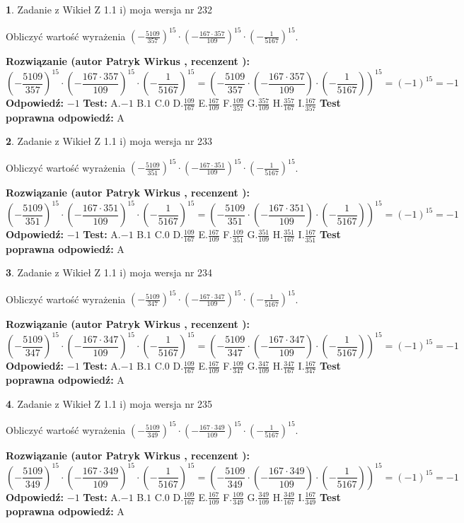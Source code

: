 \documentclass[12pt, a4paper]{article}
\theoremstyle{definition} %
\newtheorem{zad}{}
\newcommand{\zadStart}[1]{\begin{zad}#1\newline}
\newcommand{\zadStop}{\end{zad}}
\newcommand{\rozwStart}[2]{\noindent \textbf{Rozwiązanie (autor #1 , recenzent #2): }\newline}
\newcommand{\rozwStop}{\newline}
\newcommand{\odpStart}{\noindent \textbf{Odpowiedź:}\newline}
\newcommand{\odpStop}{\newline}
\newcommand{\testStart}{\noindent \textbf{Test:}\newline}
\newcommand{\testStop}{\newline}
\newcommand{\kluczStart}{\noindent \textbf{Test poprawna odpowiedź:}\newline}
\newcommand{\kluczStop}{\newline}
\begin{document}
\zadStart{Zadanie z Wikieł Z 1.1 i) moja wersja nr 232}

Obliczyć wartość wyrażenia $(-\frac{5109}{357})^{15} \cdot (-\frac{167 \cdot 357}{109})^{15} \cdot (-\frac{1}{5167})^{15}$.
\zadStop
\rozwStart{Patryk Wirkus}{}
$$(-\frac{5109}{357})^{15} \cdot (-\frac{167 \cdot 357}{109})^{15} \cdot (-\frac{1}{5167})^{15} = (-\frac{5109}{357} \cdot (-\frac{167 \cdot 357}{109}) \cdot (-\frac{1}{5167}))^{15} = (-1)^{15} = -1$$
\rozwStop
\odpStart
$-1$
\odpStop
\testStart
A.$-1$ B.$1$ C.$0$ D.$\frac{109}{167}$ E.$\frac{167}{109}$
F.$\frac{109}{357}$ G.$\frac{357}{109}$
H.$\frac{357}{167}$
I.$\frac{167}{357}$
\testStop
\kluczStart
A
\kluczStop



\zadStart{Zadanie z Wikieł Z 1.1 i) moja wersja nr 233}

Obliczyć wartość wyrażenia $(-\frac{5109}{351})^{15} \cdot (-\frac{167 \cdot 351}{109})^{15} \cdot (-\frac{1}{5167})^{15}$.
\zadStop
\rozwStart{Patryk Wirkus}{}
$$(-\frac{5109}{351})^{15} \cdot (-\frac{167 \cdot 351}{109})^{15} \cdot (-\frac{1}{5167})^{15} = (-\frac{5109}{351} \cdot (-\frac{167 \cdot 351}{109}) \cdot (-\frac{1}{5167}))^{15} = (-1)^{15} = -1$$
\rozwStop
\odpStart
$-1$
\odpStop
\testStart
A.$-1$ B.$1$ C.$0$ D.$\frac{109}{167}$ E.$\frac{167}{109}$
F.$\frac{109}{351}$ G.$\frac{351}{109}$
H.$\frac{351}{167}$
I.$\frac{167}{351}$
\testStop
\kluczStart
A
\kluczStop



\zadStart{Zadanie z Wikieł Z 1.1 i) moja wersja nr 234}

Obliczyć wartość wyrażenia $(-\frac{5109}{347})^{15} \cdot (-\frac{167 \cdot 347}{109})^{15} \cdot (-\frac{1}{5167})^{15}$.
\zadStop
\rozwStart{Patryk Wirkus}{}
$$(-\frac{5109}{347})^{15} \cdot (-\frac{167 \cdot 347}{109})^{15} \cdot (-\frac{1}{5167})^{15} = (-\frac{5109}{347} \cdot (-\frac{167 \cdot 347}{109}) \cdot (-\frac{1}{5167}))^{15} = (-1)^{15} = -1$$
\rozwStop
\odpStart
$-1$
\odpStop
\testStart
A.$-1$ B.$1$ C.$0$ D.$\frac{109}{167}$ E.$\frac{167}{109}$
F.$\frac{109}{347}$ G.$\frac{347}{109}$
H.$\frac{347}{167}$
I.$\frac{167}{347}$
\testStop
\kluczStart
A
\kluczStop



\zadStart{Zadanie z Wikieł Z 1.1 i) moja wersja nr 235}

Obliczyć wartość wyrażenia $(-\frac{5109}{349})^{15} \cdot (-\frac{167 \cdot 349}{109})^{15} \cdot (-\frac{1}{5167})^{15}$.
\zadStop
\rozwStart{Patryk Wirkus}{}
$$(-\frac{5109}{349})^{15} \cdot (-\frac{167 \cdot 349}{109})^{15} \cdot (-\frac{1}{5167})^{15} = (-\frac{5109}{349} \cdot (-\frac{167 \cdot 349}{109}) \cdot (-\frac{1}{5167}))^{15} = (-1)^{15} = -1$$
\rozwStop
\odpStart
$-1$
\odpStop
\testStart
A.$-1$ B.$1$ C.$0$ D.$\frac{109}{167}$ E.$\frac{167}{109}$
F.$\frac{109}{349}$ G.$\frac{349}{109}$
H.$\frac{349}{167}$
I.$\frac{167}{349}$
\testStop
\kluczStart
A
\kluczStop
\end{document}
